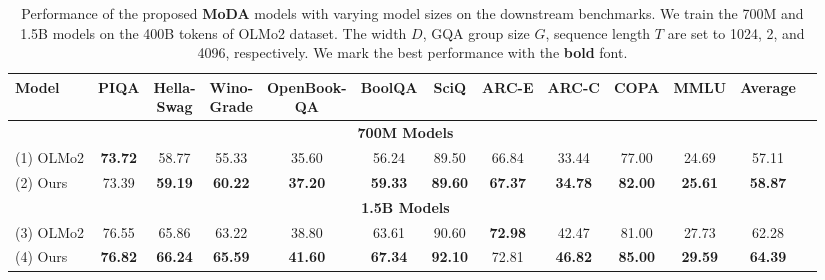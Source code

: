 \documentclass[]{bytedance_seed}
\newcommand{\name}{MoDA}
\begin{document}
\begin{table}[t]
    \caption{Performance of the proposed \textbf{\name} models with varying model sizes on the downstream benchmarks.
    We train the 700M and 1.5B models on the 400B tokens of OLMo2 dataset.
    The width $D$, GQA group size $G$, sequence length $T$ are set to 1024, 2, and 4096, respectively.
    We mark the best performance with the \textbf{bold} font.
    }
    \label{tab:downstream_results}
    \centering
    \footnotesize
    \begin{tabular}{l|cccccccccccc} 
    \toprule
    Model                 & PIQA & \makecell{Hella-\\Swag} & \makecell{Wino-\\Grade} & \makecell{OpenBook-\\QA} & BoolQA & SciQ & ARC-E & ARC-C & COPA & MMLU & Average  \\
    \midrule
    \multicolumn{12}{c}{\bfseries 700M Models} \\
    \midrule
    (1) OLMo2 & \textbf{73.72} & 58.77 & 55.33 & 35.60 & 56.24 & 89.50 & 66.84 & 33.44 & 77.00 & 24.69 & 57.11 \\
    (2) Ours & 73.39 & \textbf{59.19} & \textbf{60.22} & \textbf{37.20} & \textbf{59.33} & \textbf{89.60} & \textbf{67.37} & \textbf{34.78} & \textbf{82.00} & \textbf{25.61} & \textbf{58.87} \\
    \midrule
    \multicolumn{12}{c}{\bfseries 1.5B Models} \\
    \midrule
    (3) OLMo2 & 76.55 & 65.86 & 63.22 & 38.80 & 63.61 & 90.60 & \textbf{72.98} & 42.47 & 81.00 & 27.73 & 62.28 \\
    (4) Ours & \textbf{76.82} & \textbf{66.24} & \textbf{65.59} & \textbf{41.60} & \textbf{67.34} & \textbf{92.10} & 72.81 & \textbf{46.82} & \textbf{85.00} & \textbf{29.59} & \textbf{64.39} \\
    \bottomrule
    \end{tabular}
    \end{table}
\end{document}
